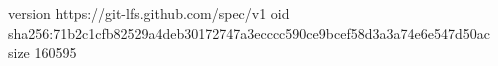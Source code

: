 version https://git-lfs.github.com/spec/v1
oid sha256:71b2c1cfb82529a4deb30172747a3ecccc590ce9bcef58d3a3a74e6e547d50ac
size 160595

